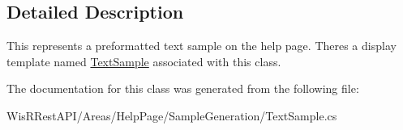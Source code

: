 \subsection{Detailed Description}
This represents a preformatted text sample on the help page. There\textquotesingle{}s a display template named \hyperlink{class_wis_r_rest_a_p_i_1_1_areas_1_1_help_page_1_1_text_sample}{Text\+Sample} associated with this class. 



The documentation for this class was generated from the following file\+:\begin{DoxyCompactItemize}
\item 
Wis\+R\+Rest\+A\+P\+I/\+Areas/\+Help\+Page/\+Sample\+Generation/Text\+Sample.\+cs\end{DoxyCompactItemize}
